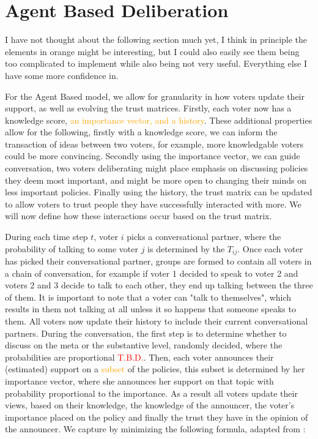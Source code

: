 \section{Agent Based Deliberation} \textcolor{RedViolet}{I have not thought
about the following section much yet, I think in principle the elements in
orange might be interesting, but I could also easily see them being too
complicated to implement while also being not very useful. Everything else I
have some more confidence in.}

For the Agent Based model, we allow for granularity in how voters update their
support, as well as evolving the trust matrices. Firstly, each voter now has a
knowledge score, \textcolor{orange}{an importance vector, and a history}. These
additional properties allow for the following, firstly with a knowledge score,
we can inform the transaction of ideas between two voters, for example, more
knowledgable voters could be more convincing. Secondly using the importance
vector, we can guide conversation, two voters deliberating might place emphasis
on discussing policies they deem most important, and might be more open to
changing their minds on less important policies. Finally using the history, the
trust matrix can be updated to allow voters to trust people they have
successfully interacted with more. We will now define how these interactions
occur based on the trust matrix.


During each time step $t$, voter $i$ picks a conversational partner, where the
probability of talking to some voter $j$ is determined by the $T_{ij}$. Once
each voter has picked their conversational partner, groups are formed to
contain all voters in a chain of conversation, for example if voter 1 decided
to speak to voter 2 and voters 2 and 3 decide to talk to each other, they end
up talking between the three of them. It is important to note that a voter can
"talk to themselves", which results in them not talking at all unless it so
happens that someone speaks to them. All voters now update their history to
include their current conversational partners. During the conversation, the
first step is to determine whether to discuss on the meta or the substantive
level, randomly decided, where the probabilities are proportional
\textcolor{red}{T.B.D.}. Then, each voter announces their (estimated) support
on a \textcolor{orange}{subset} of the policies, this subset is determined by
her importance vector, where she announces her support on that topic with
probability proportional to the importance. As a result all voters update their
views, based on their knowledge, the knowledge of the announcer, the voter's
importance placed on the policy and finally the trust they have in the opinion
of the announcer. We capture by minimizing the following formula, adapted from
\citet{radDeliberationSinglePeakednessCoherent2021}:

